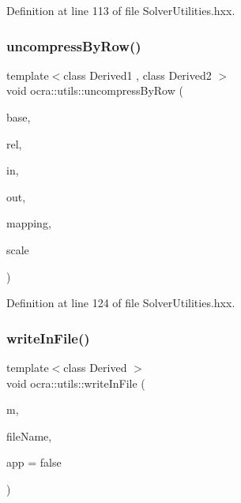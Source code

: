 Definition at line 113 of file Solver\+Utilities.\+hxx.

\hypertarget{namespaceocra_1_1utils_aa1f9829f8b85e3b006b691a924b12e3f}{}\label{namespaceocra_1_1utils_aa1f9829f8b85e3b006b691a924b12e3f} 
\subsubsection{\texorpdfstring{uncompress\+By\+Row()}{uncompressByRow()}\hspace{0.1cm}{\footnotesize\ttfamily [2/2]}}
{\footnotesize\ttfamily template$<$class Derived1 , class Derived2 $>$ \\
void ocra\+::utils\+::uncompress\+By\+Row (\begin{DoxyParamCaption}\item[{const \hyperlink{classocra_1_1Variable}{Variable} \&}]{base,  }\item[{const \hyperlink{classocra_1_1Variable}{Variable} \&}]{rel,  }\item[{const Matrix\+Base$<$ Derived1 $>$ \&}]{in,  }\item[{Matrix\+Base$<$ Derived2 $>$ const \&}]{out,  }\item[{std\+::vector$<$ int $>$ \&}]{mapping,  }\item[{double}]{scale }\end{DoxyParamCaption})\hspace{0.3cm}{\ttfamily [inline]}}



Definition at line 124 of file Solver\+Utilities.\+hxx.

\hypertarget{namespaceocra_1_1utils_a3f12986cd4d4a40293f6003d9a86a45c}{}\label{namespaceocra_1_1utils_a3f12986cd4d4a40293f6003d9a86a45c} 
\subsubsection{\texorpdfstring{write\+In\+File()}{writeInFile()}\hspace{0.1cm}{\footnotesize\ttfamily [1/3]}}
{\footnotesize\ttfamily template$<$class Derived $>$ \\
void ocra\+::utils\+::write\+In\+File (\begin{DoxyParamCaption}\item[{const Matrix\+Base$<$ Derived $>$ \&}]{m,  }\item[{const std\+::string \&}]{file\+Name,  }\item[{bool}]{app = {\ttfamily false} }\end{DoxyParamCaption})\hspace{0.3cm}{\ttfamily [inline]}}



